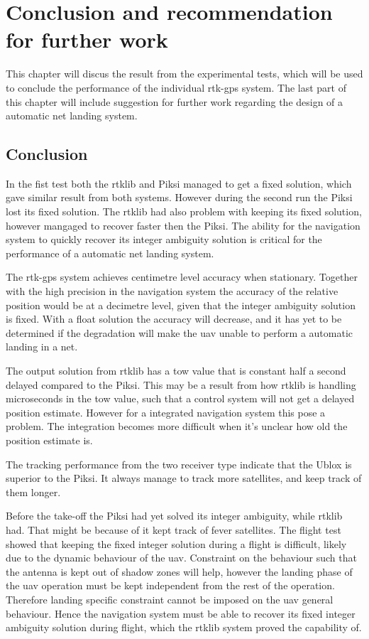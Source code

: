 
\chapter{Conclusion and recommendation for further work}
This chapter will discus the result from the experimental tests, which will be used to conclude the performance of the individual \gls{rtk-gps} system. The last part of this chapter will include suggestion for further work regarding the design of a automatic net landing system.
\section{Conclusion}
In the fist test both the \gls{rtklib} and Piksi managed to get a fixed solution, which gave similar result from both systems. However during the second run the Piksi lost its fixed solution. The \gls{rtklib} had also problem with keeping its fixed solution, however mangaged to recover faster then the Piksi. The ability for the navigation system to quickly recover its integer ambiguity solution is critical for the performance of a automatic net landing system.

The \gls{rtk-gps} system achieves centimetre level accuracy when stationary. Together with the high precision in the navigation system the accuracy of the relative position would be at a decimetre level, given that the integer ambiguity solution is fixed. With a float solution the accuracy will decrease, and it has yet to be determined if the degradation will make the \gls{uav} unable to perform a automatic landing in a net.

The output solution from \gls{rtklib} has a \acrfull{tow} value that is constant half a second delayed compared to the Piksi. This may be a result from how \gls{rtklib} is handling microseconds in the \gls{tow} value, such that a control system will not get a delayed position estimate. However for a integrated navigation system this pose a problem. The integration becomes more difficult when it's unclear how old the position estimate is.

The tracking performance from the two receiver type indicate that the Ublox is superior to the Piksi. It always manage to track more satellites, and keep track of them longer.

Before the take-off the Piksi had yet solved its integer ambiguity, while \gls{rtklib} had. That might be because of it kept track of fever satellites. 
The flight test showed that keeping the fixed integer solution during a flight is difficult, likely due to the dynamic behaviour of the \gls{uav}. Constraint on the behaviour such that the antenna is kept out of shadow zones will help, however the landing phase of the \gls{uav} operation must be kept independent from the rest of the operation. Therefore landing specific constraint cannot be imposed on the \gls{uav} general behaviour. Hence the navigation system must be able to recover its fixed integer ambiguity solution during flight, which the \gls{rtklib} system proved the capability of.


